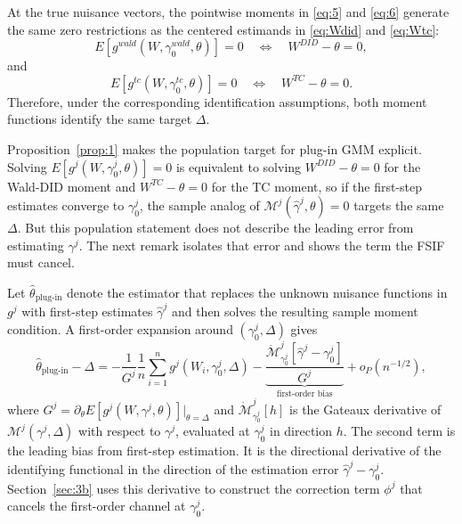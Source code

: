 \begin{proposition}\label{prop:1}
At the true nuisance vectors, the pointwise moments in \eqref{eq:5} and \eqref{eq:6} generate the same zero restrictions as the centered estimands in \eqref{eq:Wdid} and \eqref{eq:Wtc}:
\[
    E[g^{wald}(W,\gamma^{wald}_0,\theta)]=0
    \quad\Longleftrightarrow\quad
    W^{DID}-\theta=0,
\]
and
\[
    E[g^{tc}(W,\gamma^{tc}_0,\theta)]=0
    \quad\Longleftrightarrow\quad
    W^{TC}-\theta=0.
\]
Therefore, under the corresponding identification assumptions, both moment functions identify the same target $\Delta$.
\end{proposition}


Proposition~\ref{prop:1} makes the population target for plug-in GMM explicit. Solving $E[g^j(W,\gamma^j_0,\theta)]=0$ is equivalent to solving $W^{DID}-\theta=0$ for the Wald-DID moment and $W^{TC}-\theta=0$ for the TC moment, so if the first-step estimates converge to $\gamma^j_0$, the sample analog of $\mathcal{M}^j(\hat\gamma^j,\theta)=0$ targets the same $\Delta$. But this population statement does not describe the leading error from estimating $\gamma^j$. The next remark isolates that error and shows the term the FSIF must cancel.

\begin{remark}\label{cor:bias}
Let $\hat\theta_{\text{plug-in}}$ denote the estimator that replaces the unknown nuisance functions in $g^j$ with first-step estimates $\hat\gamma^j$ and then solves the resulting sample moment condition. A first-order expansion around $(\gamma^j_0,\Delta)$ gives
\begin{equation}\label{eq:plugin_bias_linearization}
    \hat\theta_{\text{plug-in}} - \Delta
    =
    -\frac{1}{G^j}\frac{1}{n}\sum_{i=1}^n g^j(W_i,\gamma^j_0,\Delta)
    -
    \underbrace{\frac{\dot{\mathcal{M}}^j_{\gamma^j_0}[\hat\gamma^j-\gamma^j_0]}{G^j}}_{\text{first-order bias}}
    + o_P(n^{-1/2}),
\end{equation}
where $G^j = \partial_\theta E[g^j(W,\gamma^j,\theta)]|_{\theta=\Delta}$ and $\dot{\mathcal{M}}^j_{\gamma^j_0}[h]$ is the Gateaux derivative of $\mathcal{M}^j(\gamma^j,\Delta)$ with respect to $\gamma^j$, evaluated at $\gamma^j_0$ in direction $h$. The second term is the leading bias from first-step estimation. It is the directional derivative of the identifying functional in the direction of the estimation error $\hat\gamma^j-\gamma^j_0$. Section~\ref{sec:3b} uses this derivative to construct the correction term $\phi^j$ that cancels the first-order channel at $\gamma^j_0$.
\end{remark}


